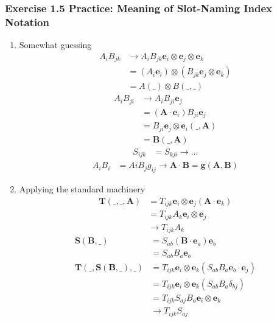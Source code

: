 \documentclass[10pt,a4paper]{article}
\theoremstyle{definition}
\begin{document}
\subsubsection{Exercise 1.5 Practice: Meaning of Slot-Naming Index Notation}
\begin{enumerate}[label=(\alph*)]
\item Somewhat guessing
\begin{align}
    A_iB_{jk}
    &\rightarrow A_iB_{jk}\mathbf{e}_i\otimes\mathbf{e}_j\otimes\mathbf{e}_k\\
    &= (A_i\mathbf{e}_i)\otimes (B_{jk}\mathbf{e}_j\otimes\mathbf{e}_k)\\
    &=A(\_)\otimes B(\_,\_)
\end{align}
\begin{align}
    A_iB_{ji}
    &\rightarrow A_iB_{ji}\mathbf{e}_j\\
    &=(\mathbf{A}\cdot\mathbf{e}_i)B_{ji}\mathbf{e}_j\\
    &=B_{ji}\mathbf{e}_j\otimes\mathbf{e}_i(\_,\mathbf{A})\\
    &=\mathbf{B}(\_,\mathbf{A})
\end{align}
\begin{align}
    S_{ijk}
    &=S_{kji}\rightarrow ...
\end{align}
\begin{align}
    A_iB_i&=AiB_jg_{ij}\rightarrow \mathbf{A}\cdot\mathbf{B}=\mathbf{g}(\mathbf{A},\mathbf{B})
\end{align}

\item Applying the standard machinery
\begin{align}
    \mathbf{T}(\_,\_,\mathbf{A})
    &=T_{ijk}\mathbf{e}_i\otimes\mathbf{e}_j(\mathbf{A}\cdot\mathbf{e}_k)\\
    &=T_{ijk}A_k\mathbf{e}_i\otimes\mathbf{e}_j\\
    &\rightarrow T_{ijk}A_k
\end{align}
\begin{align}
    \mathbf{S}(\mathbf{B},\_)
    &=S_{ab}(\mathbf{B}\cdot\mathbf{e}_a)\mathbf{e}_b\\
    &=S_{ab}B_a\mathbf{e}_b\\
    \mathbf{T}(\_,\mathbf{S}(\mathbf{B},\_),\_)
    &=T_{ijk}\mathbf{e}_i\otimes\mathbf{e}_k(S_{ab}B_a\mathbf{e}_b\cdot\mathbf{e}_j)\\
    &=T_{ijk}\mathbf{e}_i\otimes\mathbf{e}_k(S_{ab}B_a\delta_{bj})\\
    &=T_{ijk}S_{aj}B_a\mathbf{e}_i\otimes\mathbf{e}_k\\
    &\rightarrow T_{ijk}S_{aj}
\end{align}
\end{enumerate}
\end{document}
